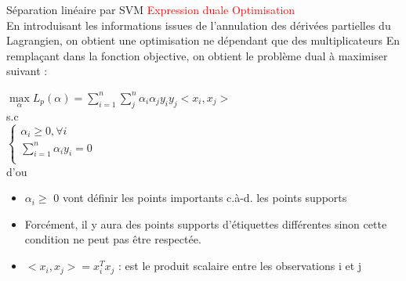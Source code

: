\documentclass{bredelebeamer}
\begin{document}
 \begin{frame}{Séparation linéaire par SVM}
\textcolor{red}{Expression duale Optimisation }\vspace{1\baselineskip} \\
    
 En introduisant les informations issues de l’annulation des dérivées partielles du Lagrangien, on obtient une optimisation ne dépendant que  des multiplicateurs
En remplaçant dans la fonction objective, on obtient le problème dual à maximiser suivant :
 
    $\max\limits_\alpha L_p(\alpha)= \sum\limits_{i=1}^{n}\sum\limits_{j}^{n} \alpha_i\alpha_j y_i y_j <x_i,x_j>$\\
s.c\\
$\left\{ \begin{array}{ll}
\alpha_i \geq 0, \forall i\\
\sum\limits_{i=1}^{n} \alpha_i y_i=0\\
\end{array}\right.$    \vspace{1\baselineskip} \\
d'ou \begin{itemize} 
        
       \item $\alpha_i \geq$ 0  vont définir les points importants c.à-d. les points supports \vspace{1\baselineskip} \\
       \item Forcément, il y aura des points supports d’étiquettes différentes sinon cette condition ne peut pas être respectée. \\
       \item   $<x_i,x_j>=x_i^{T}x_j$ : est le produit scalaire entre les observations i et j \\

     \end{itemize}
\end{frame}
\end{document}
